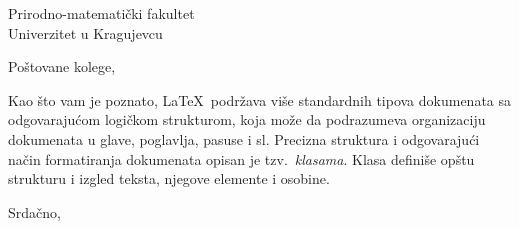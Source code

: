 \documentclass{letter}
\begin{document}
\begin{letter}{Prirodno-matematički fakultet \\
Univerzitet u Kragujevcu}
\opening{Poštovane kolege,}
Kao što vam je poznato, \LaTeX\ podržava više standardnih
tipova dokumenata sa odgovarajućom logičkom strukturom, koja
može da podrazumeva organizaciju dokumenata u glave,
poglavlja, pasuse i sl. Precizna struktura i odgovarajući
način formatiranja dokumenata opisan je tzv.~{\em klasama}.
Klasa definiše opštu strukturu i izgled teksta, njegove
elemente i osobine.
\closing{Srdačno,}
\end{letter}
\end{document}
